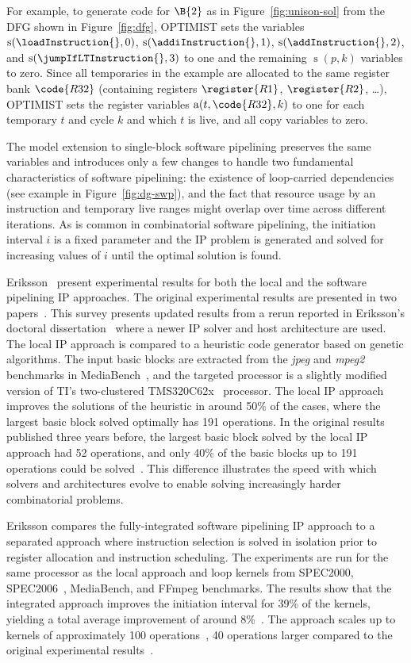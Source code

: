 \documentclass[acmsmall,authorversion,nonacm]{acmart}
\newcommand{\noMathVar}[2]{\operatorname{#1}(#2)}
\newcommand{\var}[2]{$\noMathVar{#1}{#2}$}
\begin{document}
For example, to generate code for $\B{2}$ as in
Figure~\ref{fig:unison-sol} from the DFG shown in
Figure~\ref{fig:dfg}, OPTIMIST sets the variables
\var{s}{\loadInstruction{},0}, \var{s}{\addiInstruction{},1},
\var{s}{\addInstruction{},2}, and \var{s}{\jumpIfLTInstruction{},3} to
one and the remaining \var{s}{p,k} variables to zero.
Since all temporaries in the example are allocated to the same
register bank $\code{R32}$ (containing registers $\register{R1}$,
$\register{R2}$, \dots), OPTIMIST sets the register variables
\var{a}{t,\code{R32},k} to one for each temporary $t$ and cycle $k$
and which $t$ is live, and all copy variables to zero.

The model extension to single-block software pipelining preserves the
same variables and introduces only a few changes to handle two
fundamental characteristics of software pipelining: the existence
of loop-carried dependencies (see example in Figure~\ref{fig:dg-swp}),
and the fact that resource usage by an instruction and temporary live
ranges might overlap over time across different iterations.
As is common in combinatorial software pipelining, the initiation
interval $i$ is a fixed parameter and the IP problem is generated and
solved for increasing values of $i$ until the optimal solution is
found.

Eriksson~\etal{} present experimental results for both the local and
the software pipelining IP approaches.
The original experimental results are presented in two
papers~\cite{Eriksson2008,Eriksson2012}.
This survey presents updated results from a rerun reported in
Eriksson's doctoral dissertation~\cite{Eriksson2011} where a newer IP
solver and host architecture are used.
The local IP approach is compared to a heuristic code generator based
on genetic algorithms.
The input basic blocks are extracted from the \emph{jpeg} and
\emph{mpeg2} benchmarks in MediaBench~\cite{Lee1997}, and the targeted
processor is a slightly modified version of TI's
two-clustered TMS320C62x~\cite{C62x} processor.
The local IP approach improves the solutions of the heuristic in
around 50\% of the cases, where the largest basic block solved
optimally has 191 operations.
In the original results published three years before, the largest
basic block solved by the local IP approach had 52 operations, and
only 40\% of the basic blocks up to 191 operations could be
solved~\cite{Eriksson2008}.
This difference illustrates the speed with which solvers and
architectures evolve to enable solving increasingly harder
combinatorial problems.

Eriksson compares the fully-integrated software pipelining IP approach
to a separated approach where instruction selection is solved in
isolation prior to register allocation and instruction scheduling.
The experiments are run for the same processor as the local approach
and loop kernels from SPEC2000, SPEC2006~\cite{CPU}, MediaBench, and
FFmpeg benchmarks.
The results show that the integrated approach improves the initiation
interval for 39\% of the kernels, yielding a total average improvement
of around 8\%~\cite[Chapter 8]{Eriksson2011}.
The approach scales up to kernels of approximately 100
operations~\cite[Chapter 4]{Eriksson2011}, 40 operations larger
compared to the original experimental results~\cite{Eriksson2012}.
\end{document}
